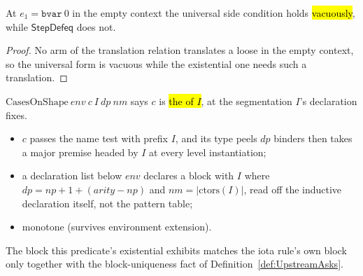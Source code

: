 \begin{lemma}
\label{lem:forall_form_not_stepDefeq}
\leanok
{}
 At $e_1 = \mathtt{bvar}\ 0$ in the empty context the universal side condition
holds \hl{vacuously}, while $\mathsf{StepDefeq}$ does not.
\end{lemma}
\begin{proof}
\leanok
{}
 No arm of the translation relation translates a loose  in the empty
context, so the universal form is vacuous while the existential one needs such a translation.
\end{proof}

\begin{definition}
\label{def:CasesOnShape}
\leanok
{}
 $\mathrm{CasesOnShape}\ env\ c\ I\ dp\ nm$ says $c$ is \hl{the  of
$I$}, at the segmentation $I$'s declaration fixes.
\begin{itemize}
\item $c$ passes the  name test with prefix $I$, and its type peels $dp$ binders
then takes a major premise headed by $I$ at every level instantiation;
\item a declaration list below $env$ declares a block with $I$ where $dp = np+1+(arity-np)$ and
$nm=|\mathrm{ctors}(I)|$, read off the inductive declaration itself, not the pattern table;
\item monotone (survives environment extension).
\end{itemize}
\end{definition}

\begin{remark}
 The block this predicate's existential exhibits matches the iota rule's own block
only together with the block-uniqueness fact of Definition~\ref{def:UpstreamAsks}.
\end{remark}

